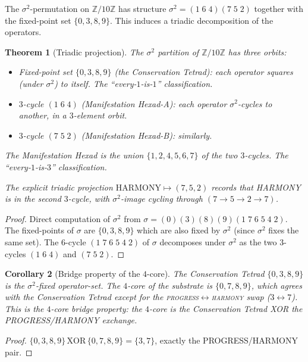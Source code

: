 \documentclass[11pt,reqno]{amsart}
\theoremstyle{plain}
\newtheorem{theorem}{Theorem}[section]
\newtheorem{corollary}[theorem]{Corollary}
\theoremstyle{definition}
\theoremstyle{remark}
\newcommand{\Z}{\mathbb{Z}}
\begin{document}
The $\sigma^2$-permutation on $\Z/10\Z$ has structure
$\sigma^2 = (1\;6\;4)(7\;5\;2)$ together with the fixed-point set
$\{0, 3, 8, 9\}$. This induces a triadic decomposition of the
operators.

\begin{theorem}[Triadic projection]\label{thm:triadic}
The $\sigma^2$ partition of $\Z/10\Z$ has three orbits:
\begin{itemize}
\item Fixed-point set $\{0, 3, 8, 9\}$ (the \emph{Conservation Tetrad}):
each operator squares (under $\sigma^2$) to itself. The
``every-$1$-is-$1$'' classification.
\item $3$-cycle $(1\;6\;4)$ (\emph{Manifestation Hexad-A}):
each operator $\sigma^2$-cycles to another, in a
$3$-element orbit.
\item $3$-cycle $(7\;5\;2)$ (\emph{Manifestation Hexad-B}):
similarly.
\end{itemize}
The Manifestation Hexad is the union $\{1, 2, 4, 5, 6, 7\}$ of the two
$3$-cycles. The ``every-$1$-is-$3$'' classification.

The explicit triadic projection $\mathrm{HARMONY} \mapsto (7, 5, 2)$
records that HARMONY is in the second $3$-cycle, with
$\sigma^2$-image cycling through $(7 \to 5 \to 2 \to 7)$.
\end{theorem}

\begin{proof}
Direct computation of $\sigma^2$ from
$\sigma = (0)(3)(8)(9)(1\;7\;6\;5\;4\;2)$. The
fixed-points of $\sigma$ are $\{0, 3, 8, 9\}$ which are also fixed
by $\sigma^2$ (since $\sigma^2$ fixes the same set). The $6$-cycle
$(1\;7\;6\;5\;4\;2)$ of $\sigma$ decomposes under $\sigma^2$ as the
two $3$-cycles $(1\;6\;4)$ and $(7\;5\;2)$.
\end{proof}

\begin{corollary}[Bridge property of the $4$-core]
The Conservation Tetrad $\{0, 3, 8, 9\}$ is the $\sigma^2$-fixed
operator-set. The $4$-core of the substrate is $\{0, 7, 8, 9\}$,
which agrees with the Conservation Tetrad except for the
\textsc{progress}$\leftrightarrow$\textsc{harmony} swap
($3 \leftrightarrow 7$). This is the
\emph{$4$-core bridge property}: the $4$-core is the
Conservation Tetrad XOR the PROGRESS/HARMONY exchange.
\end{corollary}

\begin{proof}
$\{0, 3, 8, 9\} \,\mathrm{XOR}\, \{0, 7, 8, 9\} = \{3, 7\}$, exactly
the PROGRESS/HARMONY pair.
\end{proof}
\end{document}
